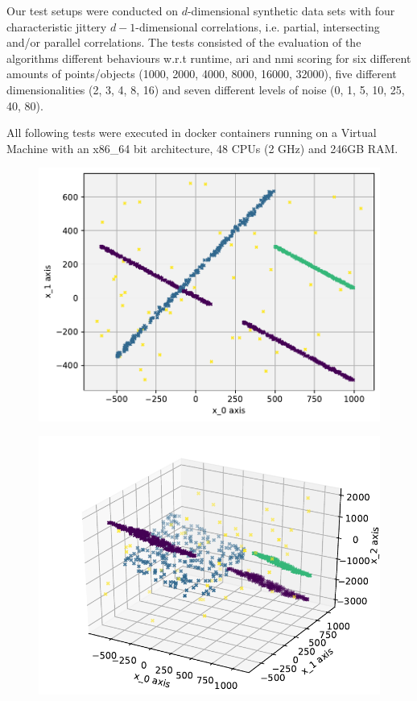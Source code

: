 Our test setups were conducted on $d$-dimensional synthetic data sets with four characteristic jittery $d-1$-dimensional correlations, i.e. partial, intersecting and/or parallel correlations. The tests consisted of the evaluation of the algorithms different behaviours w.r.t runtime, \gls{ari} and \gls{nmi} scoring for six different amounts of points/objects (1000, 2000, 4000, 8000, 16000, 32000), five different dimensionalities (2, 3, 4, 8, 16) and seven different levels of noise (0, 1, 5, 10, 25, 40, 80).

All following tests were executed in docker containers running on a Virtual Machine with an x86\_64 bit architecture, 48 CPUs (2 GHz) and 246GB RAM. 

\begin{figure}
    \centering
    \begin{minipage}[t]{.5\textwidth}
    \centering
    \captionsetup{width=.9\linewidth}
    \includegraphics[width=\textwidth]{evalfigures/2DSetGrid.pdf}
    \label{fig:my_label}
    \end{minipage}%
    \begin{minipage}[t]{.5\textwidth}
    \centering
    \captionsetup{width=.9\linewidth}
    \includegraphics[width=\textwidth]{evalfigures/3DSet.pdf}

\end{minipage}
\end{figure}
